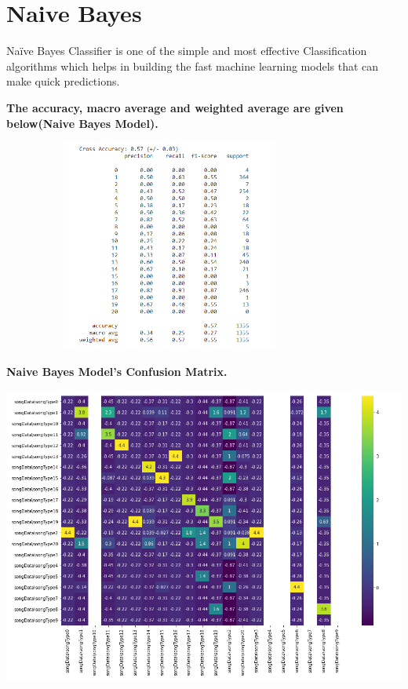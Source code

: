 \documentclass[11pt]{article}
\begin{document}
\section{Naive Bayes}
Naïve Bayes Classifier is one of the simple and most effective Classification algorithms which helps in building the fast machine learning models that can make quick predictions.
\begin{center}
\bf The accuracy, macro average and weighted average are given below(Naive Bayes Model).
\end{center}



\includegraphics[width=11cm, height=7cm]{NaiveBayesModel}

\begin{center}
\bf Naive Bayes Model's Confusion Matrix.
\end{center}

\includegraphics[scale=.6]{NaiveBayesMatrix}
\end{document}
